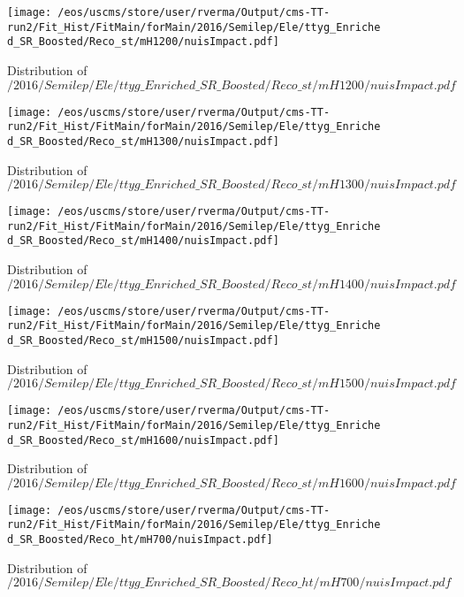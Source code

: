 \begin{figure}
\centering
\texttt{[image: /eos/uscms/store/user/rverma/Output/cms-TT-run2/Fit\_Hist/FitMain/forMain/2016/Semilep/Ele/ttyg\_Enriched\_SR\_Boosted/Reco\_st/mH1200/nuisImpact.pdf]}
\caption{Distribution of $/2016/Semilep/Ele/ttyg\_Enriched\_SR\_Boosted/Reco\_st/mH1200/nuisImpact.pdf$}
\end{figure}

\begin{figure}
\centering
\texttt{[image: /eos/uscms/store/user/rverma/Output/cms-TT-run2/Fit\_Hist/FitMain/forMain/2016/Semilep/Ele/ttyg\_Enriched\_SR\_Boosted/Reco\_st/mH1300/nuisImpact.pdf]}
\caption{Distribution of $/2016/Semilep/Ele/ttyg\_Enriched\_SR\_Boosted/Reco\_st/mH1300/nuisImpact.pdf$}
\end{figure}

\begin{figure}
\centering
\texttt{[image: /eos/uscms/store/user/rverma/Output/cms-TT-run2/Fit\_Hist/FitMain/forMain/2016/Semilep/Ele/ttyg\_Enriched\_SR\_Boosted/Reco\_st/mH1400/nuisImpact.pdf]}
\caption{Distribution of $/2016/Semilep/Ele/ttyg\_Enriched\_SR\_Boosted/Reco\_st/mH1400/nuisImpact.pdf$}
\end{figure}

\begin{figure}
\centering
\texttt{[image: /eos/uscms/store/user/rverma/Output/cms-TT-run2/Fit\_Hist/FitMain/forMain/2016/Semilep/Ele/ttyg\_Enriched\_SR\_Boosted/Reco\_st/mH1500/nuisImpact.pdf]}
\caption{Distribution of $/2016/Semilep/Ele/ttyg\_Enriched\_SR\_Boosted/Reco\_st/mH1500/nuisImpact.pdf$}
\end{figure}

\begin{figure}
\centering
\texttt{[image: /eos/uscms/store/user/rverma/Output/cms-TT-run2/Fit\_Hist/FitMain/forMain/2016/Semilep/Ele/ttyg\_Enriched\_SR\_Boosted/Reco\_st/mH1600/nuisImpact.pdf]}
\caption{Distribution of $/2016/Semilep/Ele/ttyg\_Enriched\_SR\_Boosted/Reco\_st/mH1600/nuisImpact.pdf$}
\end{figure}

\begin{figure}
\centering
\texttt{[image: /eos/uscms/store/user/rverma/Output/cms-TT-run2/Fit\_Hist/FitMain/forMain/2016/Semilep/Ele/ttyg\_Enriched\_SR\_Boosted/Reco\_ht/mH700/nuisImpact.pdf]}
\caption{Distribution of $/2016/Semilep/Ele/ttyg\_Enriched\_SR\_Boosted/Reco\_ht/mH700/nuisImpact.pdf$}
\end{figure}

